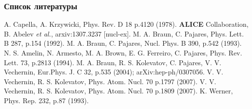 \documentclass{beamer}
\begin{document}
\begin{frame}[fragile]
\frametitle{Список литературы}
{\small
\begin{thebibliography}{00}
A. Capella, A. Krzywicki, Phys. Rev. D 18 p.4120 (1978).
{\bf ALICE} Collaboration, B. Abelev \textit{et al.}, arxiv:1307.3237 [nucl-ex].
M. A. Braun, C. Pajares, Phys. Lett. B 287, p.154 (1992).
M. A. Braun, C. Pajares, Nucl. Phys. B 390, p.542 (1993).
N. S. Amelin, N. Armesto, M. A. Brown, E. G. Ferreiro, C. Pajares, Phys. Rev. Lett. 73, p.2813 (1994).
M. A. Braun, R. S. Kolevatov, C. Pajares, V. V. Vechernin, Eur.Phys. J. C 32, p.535 (2004); arXiv:hep-ph/0307056.
V. V. Vechernin, R. S. Kolevatov, Phys. Atom. Nucl. 70 p.1797 (2007).
V. V. Vechernin, R. S. Kolevatov, Phys. Atom. Nucl. 70 p.1809 (2007).
K. Werner, Phys. Rep. 232, p.87 (1993).
\end{thebibliography}
}
\end{frame}
\end{document}
